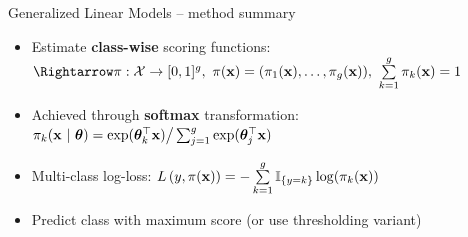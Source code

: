 \begin{vbframe}{Generalized Linear Models -- method summary}
\begin{itemize}
\end{itemize}

\medskip




\begin{itemize}
  \item Estimate \textbf{class-wise} scoring functions:
  $\Rightarrow \pi: \Xspace \rightarrow \unitint^g, ~
  \pix = (\pikx[1], \dots, \pikx[g]), ~\sumkg \pikx = 1$
  \item Achieved through \textbf{softmax} transformation: 
  $\pi_{k}(\mathbf{x} ~|~ \bm{\theta}) = \exp(\bm{\theta}_k^\top \mathbf{x}) \big/ \sum_{j=1}^g \exp(\bm{\theta}_j^\top 
  \mathbf{x})  $
  \item Multi-class log-loss: $L\left(y, \pi(\mathbf{x})\right) = - \sum\limits_{k=1}^g \mathbb{I}_{\{y = k\}} \log(\pi_{k}(\mathbf{x}))$
  \item Predict class with maximum score (or use thresholding variant)
\end{itemize}


\end{vbframe}



